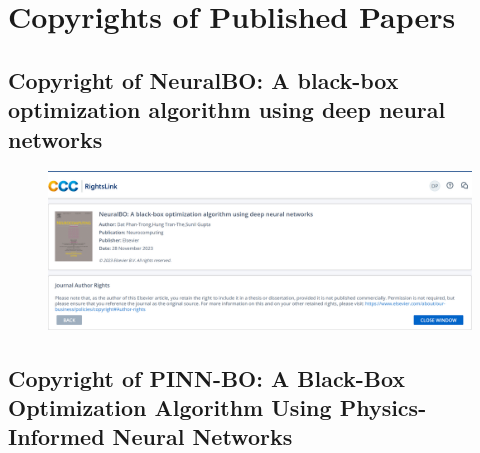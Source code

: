 \chapter*{Copyrights of Published Papers}
{}
\section*{Copyright of NeuralBO: A black-box optimization algorithm using deep neural networks}
\begin{figure}[h]
    \centering
    \includegraphics[width=\textwidth]{Figures/Elsvier.png}
\end{figure}

\section*{Copyright of PINN-BO: A Black-Box Optimization Algorithm Using Physics-Informed Neural Networks}
